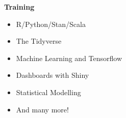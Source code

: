 \vspace{7mm}


\textbf {Training}
\begin{itemize}
\item R/Python/Stan/Scala
\item The Tidyverse
\item Machine Learning and Tensorflow
\item Dashboards with Shiny
\item Statistical Modelling
\item And many more!
\end{itemize}
